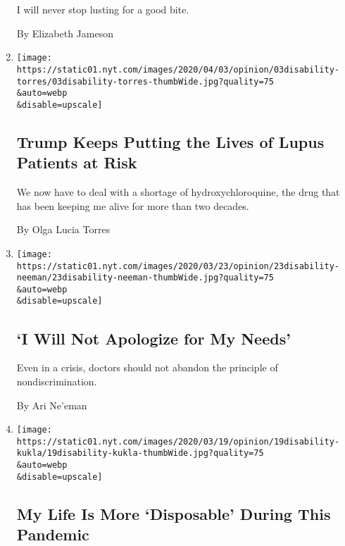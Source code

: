 \begin{enumerate}
  I will never stop lusting for a good bite.

  By Elizabeth Jameson
\item
  \href{/2020/04/06/opinion/coronavirus-hydroxychloroquine-lupus.html}{}

  \texttt{[image: https://static01.nyt.com/images/2020/04/03/opinion/03disability-torres/03disability-torres-thumbWide.jpg?quality=75\\\&auto=webp\\\&disable=upscale]}

  \hypertarget{trump-keeps-putting-the-lives-of-lupus-patients-at-risk}{%
  \subsection{Trump Keeps Putting the Lives of Lupus Patients at
  Risk}\label{trump-keeps-putting-the-lives-of-lupus-patients-at-risk}}

  We now have to deal with a shortage of hydroxychloroquine, the drug
  that has been keeping me alive for more than two decades.

  By Olga Lucia Torres
\item
  \href{/2020/03/23/opinion/coronavirus-ventilators-triage-disability.html}{}

  \texttt{[image: https://static01.nyt.com/images/2020/03/23/opinion/23disability-neeman/23disability-neeman-thumbWide.jpg?quality=75\\\&auto=webp\\\&disable=upscale]}

  \hypertarget{i-will-not-apologize-for-my-needs}{%
  \subsection{`I Will Not Apologize for My
  Needs'}\label{i-will-not-apologize-for-my-needs}}

  Even in a crisis, doctors should not abandon the principle of
  nondiscrimination.

  By Ari Ne'eman
\item
  \href{/2020/03/19/opinion/coronavirus-disabled-health-care.html}{}

  \texttt{[image: https://static01.nyt.com/images/2020/03/19/opinion/19disability-kukla/19disability-kukla-thumbWide.jpg?quality=75\\\&auto=webp\\\&disable=upscale]}

  \hypertarget{my-life-is-more-disposable-during-this-pandemic}{%
  \subsection{My Life Is More `Disposable' During This
  Pandemic}\label{my-life-is-more-disposable-during-this-pandemic}}


\end{enumerate}
